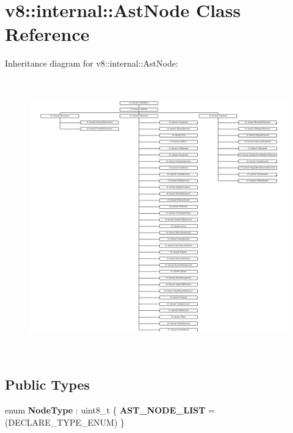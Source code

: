 \hypertarget{classv8_1_1internal_1_1AstNode}{}\section{v8\+:\+:internal\+:\+:Ast\+Node Class Reference}
\label{classv8_1_1internal_1_1AstNode}
Inheritance diagram for v8\+:\+:internal\+:\+:Ast\+Node\+:\begin{figure}[H]
\begin{center}
\leavevmode
\includegraphics[height=12.000000cm]{classv8_1_1internal_1_1AstNode}
\end{center}
\end{figure}
\subsection*{Public Types}
\begin{DoxyCompactItemize}
\item 
\mbox{\label{classv8_1_1internal_1_1AstNode_ac45ba3bb3b25fc6afad01bd1a89fd4a5}} 
enum {\bfseries Node\+Type} \+: uint8\+\_\+t \{ {\bfseries A\+S\+T\+\_\+\+N\+O\+D\+E\+\_\+\+L\+I\+ST} =(D\+E\+C\+L\+A\+R\+E\+\_\+\+T\+Y\+P\+E\+\_\+\+E\+N\+UM)
 \}
\end{DoxyCompactItemize}
